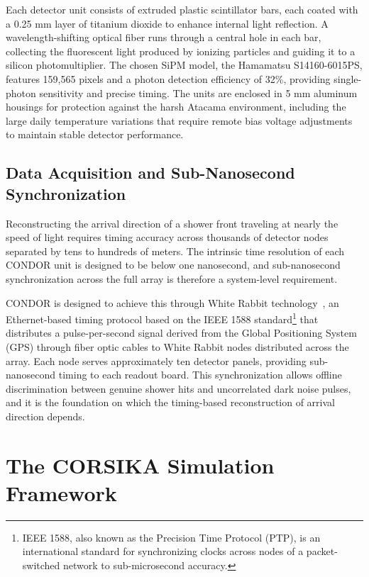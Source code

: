 Each detector unit consists of extruded plastic scintillator bars, each coated with a 0.25 $\mathrm{mm}$ layer of titanium dioxide to enhance internal light reflection. A wavelength-shifting optical fiber runs through a central hole in each bar, collecting the fluorescent light produced by ionizing particles and guiding it to a silicon photomultiplier. The chosen SiPM model, the Hamamatsu S14160-6015PS, features 159,565 pixels and a photon detection efficiency of 32\%, providing single-photon sensitivity and precise timing. The units are enclosed in 5 $\mathrm{mm}$ aluminum housings for protection against the harsh Atacama environment, including the large daily temperature variations that require remote bias voltage adjustments to maintain stable detector performance.

\subsection{Data Acquisition and Sub-Nanosecond Synchronization}

Reconstructing the arrival direction of a shower front traveling at nearly the speed of light requires timing accuracy across thousands of detector nodes separated by tens to hundreds of meters. The intrinsic time resolution of each CONDOR unit is designed to be below one nanosecond, and sub-nanosecond synchronization across the full array is therefore a system-level requirement.

CONDOR is designed to achieve this through White Rabbit technology~, an Ethernet-based timing protocol based on the IEEE 1588 standard\footnote{IEEE 1588, also known as the Precision Time Protocol (PTP), is an international standard for synchronizing clocks across nodes of a packet-switched network to sub-microsecond accuracy.} that distributes a pulse-per-second signal derived from the Global Positioning System (GPS) through fiber optic cables to White Rabbit nodes distributed across the array. Each node serves approximately ten detector panels, providing sub-nanosecond timing to each readout board. This synchronization allows offline discrimination between genuine shower hits and uncorrelated dark noise pulses, and it is the foundation on which the timing-based reconstruction of arrival direction depends.

\section{The CORSIKA Simulation Framework}
\label{sec:corsika}

